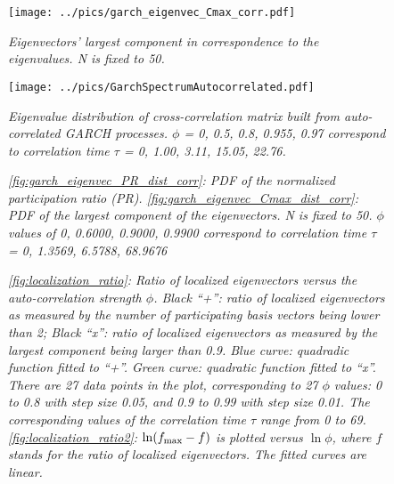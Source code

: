 \documentclass{report}
\begin{document}
\begin{figure}[htb!]
  \centering
  \texttt{[image: ../pics/garch\_eigenvec\_Cmax\_corr.pdf]}
  \caption{\small \it Eigenvectors' largest component in
    correspondence to the eigenvalues. N is fixed to 50.}
  \label{fig:garch_eigenvec_Cmax_corr}
\end{figure}

\begin{figure}[htb!]
  \centering
  \texttt{[image: ../pics/GarchSpectrumAutocorrelated.pdf]}
  \caption{\small \it Eigenvalue distribution of cross-correlation
    matrix built from auto-correlated GARCH processes. $\phi$ = 0,
    0.5, 0.8, 0.955, 0.97 correspond to correlation time $\tau$ =
    0, 1.00, 3.11, 15.05, 22.76.}
  \label{fig:GarchSpectrumAutocorrelated}
\end{figure}

\begin{figure}[htb!]
  \centering
  \caption{\small \it \ref{fig:garch_eigenvec_PR_dist_corr}: PDF of
    the normalized participation ratio
    (PR). \ref{fig:garch_eigenvec_Cmax_dist_corr}: PDF of the largest
    component of the eigenvectors. N is fixed to 50. $\phi$ values of
    0, 0.6000, 0.9000, 0.9900 correspond to correlation time $\tau$ =
    0, 1.3569, 6.5788, 68.9676}
\end{figure}

\begin{figure}[htb!]
  \centering
  \caption{\small \it \ref{fig:localization_ratio}: Ratio of localized
    eigenvectors versus the auto-correlation strength $\phi$. Black
    ``+'': ratio of localized eigenvectors as measured by the number
    of participating basis vectors being lower than 2; Black ``x'':
    ratio of localized eigenvectors as measured by the largest
    component being larger than 0.9. Blue curve: quadradic function
    fitted to ``+''. Green curve: quadratic function fitted to
    ``x''. There are 27 data points in the plot, corresponding to 27
    $\phi$ values: 0 to 0.8 with step size 0.05, and 0.9 to 0.99 with
    step size 0.01. The corresponding values of the correlation time
    $\tau$ range from 0 to 69. \ref{fig:localization_ratio2}: $\ln
    (f_{\text{max}} - f)$ is plotted versus $\ln \phi$, where $f$ stands for the
    ratio of localized eigenvectors. The fitted curves are linear.}
\end{figure}
\end{document}
